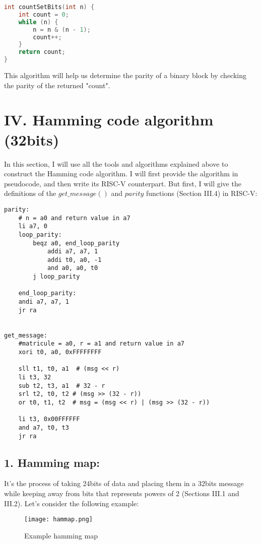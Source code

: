 \documentclass[11pt]{article}
\begin{document}
\begin{lstlisting}[language=C]
int countSetBits(int n) {
    int count = 0;
    while (n) {
        n = n & (n - 1);
        count++;
    }
    return count;
}
\end{lstlisting}

This algorithm will help us determine the parity of a binary block by checking the parity of the returned "count".

\section*{IV. Hamming code algorithm (32bits)}
In this section, I will use all the tools and algorithms explained above to construct the Hamming code algorithm. I will first provide the algorithm in pseudocode, and then write its RISC-V counterpart.
But first, I will give the definitions of the $get\_message()$ and $parity$ functions (Section III.4) in RISC-V:

\begin{lstlisting}[language=RISC-V]
parity: 
    # n = a0 and return value in a7
    li a7, 0
    loop_parity:
        beqz a0, end_loop_parity
            addi a7, a7, 1
            addi t0, a0, -1
            and a0, a0, t0
        j loop_parity

    end_loop_parity:
    andi a7, a7, 1 
    jr ra


get_message:
    #matricule = a0, r = a1 and return value in a7
    xori t0, a0, 0xFFFFFFFF

    sll t1, t0, a1  # (msg << r)
    li t3, 32 
    sub t2, t3, a1  # 32 - r
    srl t2, t0, t2 # (msg >> (32 - r))
    or t0, t1, t2  # msg = (msg << r) | (msg >> (32 - r))

    li t3, 0x00FFFFFF 
    and a7, t0, t3
    jr ra
\end{lstlisting}


\subsection*{1. Hamming map:}
It's the process of taking 24bits of data and placing them in a 32bits message while keeping away from bits that represents powers of 2 (Sections III.1 and III.2). Let's consider the following example:
\begin{figure}[H]
    \centering
    \texttt{[image: hammap.png]}
    \caption{Example hamming map}
\end{figure}
\end{document}
